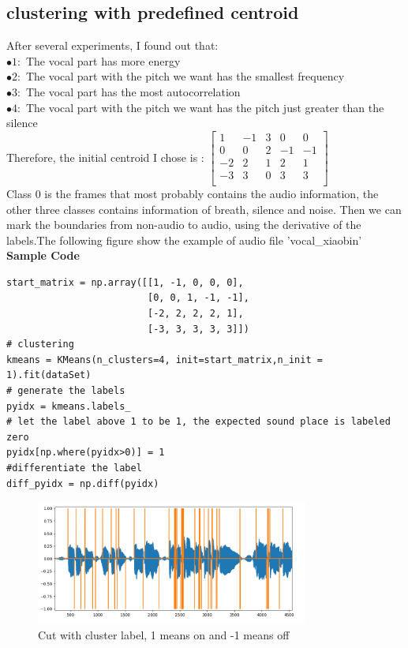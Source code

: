 \documentclass[twoside]{article}
\begin{document}
\subsection{clustering with predefined centroid}
After several experiments, I found out that: \\
$\bullet 1:$ The vocal part has more energy\\
$\bullet 2:$ The vocal part with the pitch we want has the smallest frequency\\
$\bullet 3:$ The vocal part has the most autocorrelation\\
$\bullet 4:$ The vocal part with the pitch we want has the pitch just greater than the silence\\
Therefore, the initial centroid I chose is :
$\begin{bmatrix}
1 & -1 & 3 & 0 & 0 \\
0 & 0 & 2 & -1 & -1 \\
-2 & 2 & 1 & 2 & 1 \\
-3 & 3 & 0 & 3 & 3 \\
\end{bmatrix}
$\\
Class 0 is the frames that most probably contains the audio information, the other three classes contains information of breath, silence and noise. Then we can mark the boundaries from non-audio to audio, using the derivative of the labels.The following figure show the example of audio file 'vocal\_xiaobin'\\
\textbf{Sample Code}\\
\begin{lstlisting}
start_matrix = np.array([[1, -1, 0, 0, 0],
                         [0, 0, 1, -1, -1],
                         [-2, 2, 2, 2, 1],
                         [-3, 3, 3, 3, 3]])
# clustering
kmeans = KMeans(n_clusters=4, init=start_matrix,n_init = 1).fit(dataSet)
# generate the labels
pyidx = kmeans.labels_
# let the label above 1 to be 1, the expected sound place is labeled zero
pyidx[np.where(pyidx>0)] = 1
#differentiate the label
diff_pyidx = np.diff(pyidx)
\end{lstlisting}

\begin{figure}[H]
   \centering
   \includegraphics[width = 0.8\textwidth]{first_cut.PNG}  
   \caption{Cut with cluster label, 1 means on and -1 means off}
\end{figure}
\end{document}

